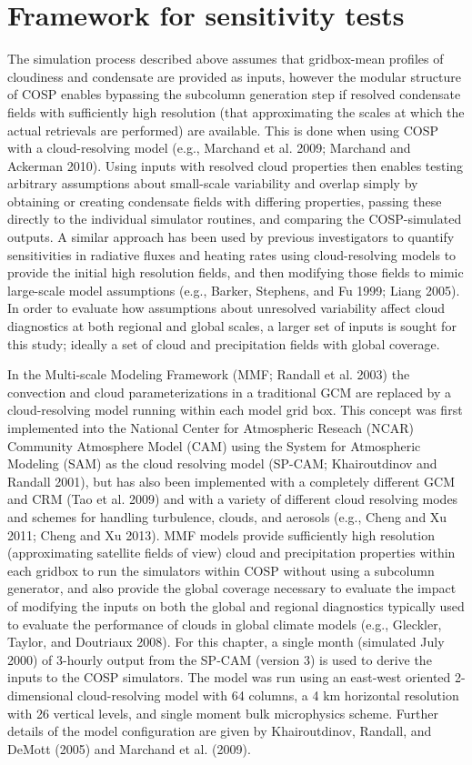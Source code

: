 \section{Framework for sensitivity
tests}\label{sec:subgridux5fframework}

The simulation process described above assumes that gridbox-mean
profiles of cloudiness and condensate are provided as inputs, however
the modular structure of COSP enables bypassing the subcolumn generation
step if resolved condensate fields with sufficiently high resolution
(that approximating the scales at which the actual retrievals are
performed) are available. This is done when using COSP with a
cloud-resolving model (e.g., Marchand et al. 2009; Marchand and Ackerman
2010). Using inputs with resolved cloud properties then enables testing
arbitrary assumptions about small-scale variability and overlap simply
by obtaining or creating condensate fields with differing properties,
passing these directly to the individual simulator routines, and
comparing the COSP-simulated outputs. A similar approach has been used
by previous investigators to quantify sensitivities in radiative fluxes
and heating rates using cloud-resolving models to provide the initial
high resolution fields, and then modifying those fields to mimic
large-scale model assumptions (e.g., Barker, Stephens, and Fu 1999;
Liang 2005). In order to evaluate how assumptions about unresolved
variability affect cloud diagnostics at both regional and global scales,
a larger set of inputs is sought for this study; ideally a set of cloud
and precipitation fields with global coverage.

In the Multi-scale Modeling Framework (MMF; Randall et al. 2003) the
convection and cloud parameterizations in a traditional GCM are replaced
by a cloud-resolving model running within each model grid box. This
concept was first implemented into the National Center for Atmospheric
Reseach (NCAR) Community Atmosphere Model (CAM) using the System for
Atmospheric Modeling (SAM) as the cloud resolving model (SP-CAM;
Khairoutdinov and Randall 2001), but has also been implemented with a
completely different GCM and CRM (Tao et al. 2009) and with a variety of
different cloud resolving modes and schemes for handling turbulence,
clouds, and aerosols (e.g., Cheng and Xu 2011; Cheng and Xu 2013). MMF
models provide sufficiently high resolution (approximating satellite
fields of view) cloud and precipitation properties within each gridbox
to run the simulators within COSP without using a subcolumn generator,
and also provide the global coverage necessary to evaluate the impact of
modifying the inputs on both the global and regional diagnostics
typically used to evaluate the performance of clouds in global climate
models (e.g., Gleckler, Taylor, and Doutriaux 2008). For this chapter, a
single month (simulated July 2000) of 3-hourly output from the SP-CAM
(version 3) is used to derive the inputs to the COSP simulators. The
model was run using an east-west oriented 2-dimensional cloud-resolving
model with 64 columns, a 4 km horizontal resolution with 26 vertical
levels, and single moment bulk microphysics scheme. Further details of
the model configuration are given by Khairoutdinov, Randall, and DeMott
(2005) and Marchand et al. (2009).

